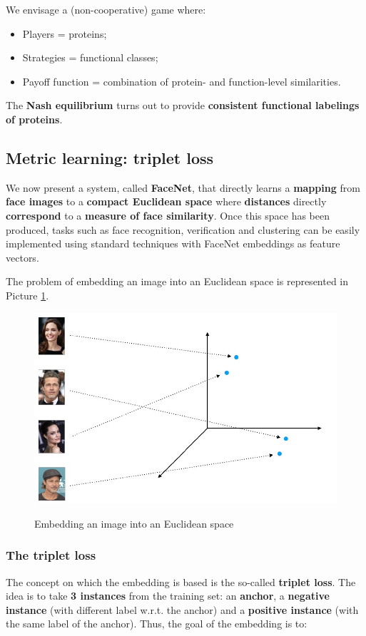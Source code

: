 We envisage a (non-cooperative) game where:

\begin{itemize}
    \item Players = proteins;
    \item Strategies = functional classes;
    \item Payoff function = combination of protein- and function-level similarities.
\end{itemize}

The \textbf{Nash equilibrium} turns out to provide \textbf{consistent functional labelings of proteins}.

\subsection{Metric learning: triplet loss}
We now present a system, called \textbf{FaceNet}, that directly learns a \textbf{mapping} from \textbf{face images} to a \textbf{compact Euclidean space} where \textbf{distances} directly \textbf{correspond} to a \textbf{measure of face similarity}. Once this space has been produced, tasks such as face recognition, verification and clustering can be easily implemented using standard techniques with FaceNet embeddings as feature vectors.

The problem of embedding an image into an Euclidean space is represented in Picture \ref{camc10}.

\begin{figure}[h!]
    \centering
    \includegraphics[scale = 1.4]{img/camc10.jpg}
    \label{camc10}
    \caption{Embedding an image into an Euclidean space}
\end{figure}

\subsubsection{The triplet loss}
The concept on which the embedding is based is the so-called \textbf{triplet loss}. The idea is to take \textbf{3 instances} from the training set: an \textbf{anchor}, a \textbf{negative instance} (with different label w.r.t. the anchor) and a \textbf{positive instance} (with the same label of the anchor). Thus, the goal of the embedding is to:

